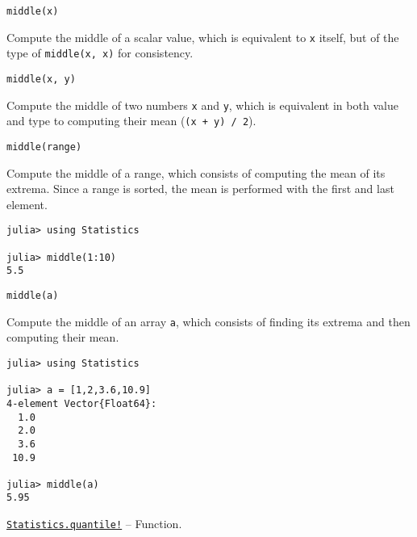 \begin{adjustwidth}{2em}{0pt}


\begin{verbatim}
middle(x)
\end{verbatim}

Compute the middle of a scalar value, which is equivalent to \texttt{x} itself, but of the type of \texttt{middle(x, x)} for consistency.




\begin{lstlisting}
middle(x, y)
\end{lstlisting}

Compute the middle of two numbers \texttt{x} and \texttt{y}, which is equivalent in both value and type to computing their mean (\texttt{(x + y) / 2}).




\begin{lstlisting}
middle(range)
\end{lstlisting}

Compute the middle of a range, which consists of computing the mean of its extrema. Since a range is sorted, the mean is performed with the first and last element.


\begin{verbatim}
julia> using Statistics

julia> middle(1:10)
5.5
\end{verbatim}




\begin{lstlisting}
middle(a)
\end{lstlisting}

Compute the middle of an array \texttt{a}, which consists of finding its extrema and then computing their mean.


\begin{verbatim}
julia> using Statistics

julia> a = [1,2,3.6,10.9]
4-element Vector{Float64}:
  1.0
  2.0
  3.6
 10.9

julia> middle(a)
5.95
\end{verbatim}



\end{adjustwidth}
\hypertarget{14611219682884062063}{}
\hyperlink{14611219682884062063}{\texttt{Statistics.quantile!}}  -- {Function.}

